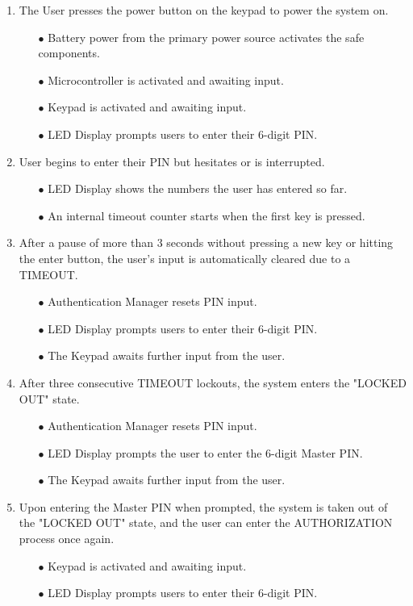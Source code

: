 \documentclass{article}
\begin{document}
\begin{enumerate}
    \item The User presses the power button on the keypad to power the system on.
    \begin{enumerate}
        \item[$\bullet$] Battery power from the primary power source activates the safe components.
        \item[$\bullet$] Microcontroller is activated and awaiting input.
        \item[$\bullet$] Keypad is activated and awaiting input.
        \item[$\bullet$] LED Display prompts users to enter their 6-digit PIN.
    \end{enumerate}
    \item User begins to enter their PIN but hesitates or is interrupted.
    \begin{enumerate}
        \item[$\bullet$] LED Display shows the numbers the user has entered so far.
        \item[$\bullet$] An internal timeout counter starts when the first key is pressed.
    \end{enumerate}
    \item After a pause of more than 3 seconds without pressing a new key or hitting the enter button, the user's input is automatically cleared due to a TIMEOUT.
    \begin{enumerate}
        \item[$\bullet$] Authentication Manager resets PIN input.
        \item[$\bullet$] LED Display prompts users to enter their 6-digit PIN.
        \item[$\bullet$] The Keypad awaits further input from the user.
    \end{enumerate}
    \item After three consecutive TIMEOUT lockouts, the system enters the "LOCKED OUT" state.
    \begin{enumerate}
        \item[$\bullet$] Authentication Manager resets PIN input.
        \item[$\bullet$] LED Display prompts the user to enter the 6-digit Master PIN.
        \item[$\bullet$] The Keypad awaits further input from the user.
    \end{enumerate}
    \item Upon entering the Master PIN when prompted, the system is taken out of the "LOCKED OUT" state, and the user can enter the AUTHORIZATION process once again.
    \begin{enumerate}
        \item[$\bullet$] Keypad is activated and awaiting input.
        \item[$\bullet$] LED Display prompts users to enter their 6-digit PIN.
    \end{enumerate}
    
\end{enumerate}
\end{document}

